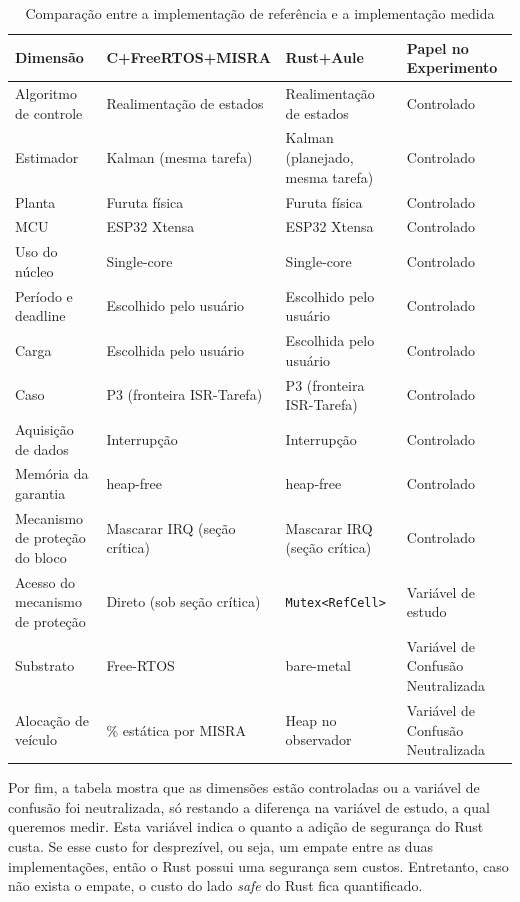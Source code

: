 \begin{table}[ht]
  \centering
  \caption{Comparação entre a implementação de referência e a implementação medida}
  \label{tab:impl-compare}
  \begin{tabularx}{\textwidth}{>{\hsize=0.5\hsize}X >{\hsize=1.0\hsize}X >{\hsize=1.5\hsize}X >{\hsize=1.0\hsize}X}
    \toprule
    Dimensão & C+\allowbreak FreeRTOS+\allowbreak MISRA & Rust+Aule & Papel no Experimento \\
    \midrule
    Algoritmo de controle & Realimentação de estados & Realimentação de estados & Controlado \\
    \hline
    Estimador & Kalman (mesma tarefa) & Kalman (planejado, mesma tarefa) & Controlado \\
    \hline
    Planta & Furuta física & Furuta física & Controlado \\
    \hline
    MCU & ESP32 Xtensa & ESP32 Xtensa & Controlado \\
    \hline
    Uso do núcleo & Single-core & Single-core & Controlado \\
    \hline
    Período e deadline & Escolhido pelo usuário & Escolhido pelo usuário & Controlado \\
    \hline
    Carga & Escolhida pelo usuário & Escolhida pelo usuário & Controlado \\
    \hline
    Caso & P3 (fronteira ISR-Tarefa) & P3 (fronteira ISR-Tarefa) & Controlado \\
    \hline
    Aquisição de dados & Interrupção & Interrupção & Controlado \\
    \hline
    Memória da garantia & heap-free & heap-free & Controlado \\
    \hline
    Mecanismo de proteção do bloco & Mascarar IRQ (seção crítica) & Mascarar IRQ (seção crítica) & Controlado \\
    \hline
    Acesso do mecanismo de proteção & Direto (sob seção crítica) & \texttt{Mutex<RefCell>} & Variável de estudo \\
    \hline
    Substrato & Free-RTOS & bare-metal & Variável de Confusão Neutralizada \\
    \hline
    Alocação de veículo & 100 \% estática por MISRA & Heap no observador & Variável de Confusão Neutralizada \\
    \bottomrule
  \end{tabularx}
\end{table}

Por fim, a tabela mostra que as dimensões estão controladas ou a variável de confusão foi neutralizada, só restando a diferença na variável de estudo, a qual queremos medir. Esta variável indica o quanto a adição de segurança do Rust custa. Se esse custo for desprezível, ou seja, um empate entre as duas implementações, então o Rust possui uma segurança sem custos. Entretanto, caso não exista o empate, o custo do lado \textit{safe} do Rust fica quantificado.

